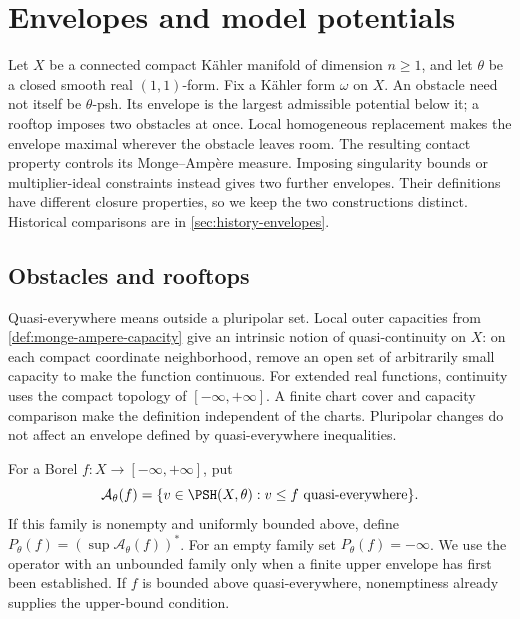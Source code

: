 \chapter{Envelopes and model potentials}
\label{chap:q10}

Let $X$ be a connected compact K\"ahler manifold of dimension $n\geq1$, and let $\theta$ be a closed smooth real $(1,1)$-form. Fix a K\"ahler form $\omega$ on $X$. An obstacle need not itself be $\theta$-psh. Its envelope is the largest admissible potential below it; a rooftop imposes two obstacles at once. Local homogeneous replacement makes the envelope maximal wherever the obstacle leaves room. The resulting contact property controls its Monge--Amp\`ere measure. Imposing singularity bounds or multiplier-ideal constraints instead gives two further envelopes. Their definitions have different closure properties, so we keep the two constructions distinct. Historical comparisons are in \cref{sec:history-envelopes}.

\section{Obstacles and rooftops}
\label{sec:global-obstacle-envelopes}
Quasi-everywhere means outside a pluripolar set. Local outer capacities from \cref{def:monge-ampere-capacity} give an intrinsic notion of quasi-continuity on $X$: on each compact coordinate neighborhood, remove an open set of arbitrarily small capacity to make the function continuous. For extended real functions, continuity uses the compact topology of $[-\infty,+\infty]$. A finite chart cover and capacity comparison make the definition independent of the charts. Pluripolar changes do not affect an envelope defined by quasi-everywhere inequalities.

\begin{definition}\label{def:global-obstacle-envelope}
For a Borel $f:X\to[-\infty,+\infty]$, put
\[
 \mathcal A_\theta(f)=\{v\in\PSH(X,\theta):v\leq f
                                     \text{ quasi-everywhere}\}.
\]
If this family is nonempty and uniformly bounded above, define
$P_\theta(f)=(\sup\mathcal A_\theta(f))^*$. For an empty family set $P_\theta(f)=-\infty$. We use the operator with an unbounded family only when a finite upper envelope has first been established. If $f$ is bounded above quasi-everywhere, nonemptiness already supplies the upper-bound condition.
\end{definition}

